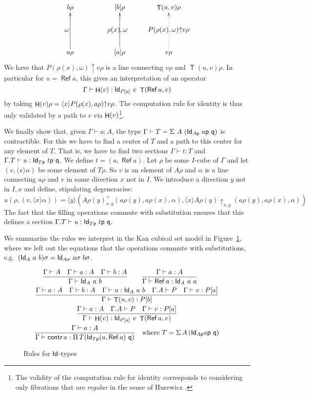 \documentclass[10pt,a4paper]{article}
\DeclareMathOperator{\Ref}{\mathsf{Ref}}
\DeclareMathOperator{\Transp}{\mathsf{T}}
\DeclareMathOperator{\HH}{{\sf H}}
\newcommand{\Id}{{\sf Id}}
\newcommand{\pp}{{\sf p}}
\newcommand{\qq}{{\sf q}}
\newcommand{\rup}[1]{#1{\uparrow}}
\newcommand{\rupxy}[1]{#1{\uparrow_{x,y}}}
\newcommand{\bind}[2]{{\langle}#1{\rangle}#2}
\begin{document}
\[
\xymatrix@R=.6cm@C=.6cm{
b\rho                 &&[b]\rho                    &   \Transp(u,v)\rho                                 \\
\omega ~~~     &&\rho(x),\omega~~  &\rup{P(\rho(x),\omega)} v\rho \\
a\rho\ar[uu]      &&[a]\rho\ar[uu]       &   v\rho\ar@{.>}[uu]                        \\
}
\]
We have that $\rup{P(\rho(x),\omega)} v\rho$ is a line connecting
$v\rho$ and $\Transp(u,v)\rho$.  In particular for $u=\Ref a$, this gives
an interpretation of an operator
$$
\Gamma\vdash \HH(v):\Id_{P[a]}~v~\Transp(\Ref a,v)
$$
by taking $\HH(v)\rho = \bind{x}{\rup{P(\rho (x),a\rho)} v\rho}$.  The
computation rule for identity is thus only validated by a path to $v$
via $\HH(v)$\footnote{The validity of the computation rule for
  identity corresponds to considering only fibrations that are {\em
    regular} in the sense of Hurewicz \cite{hurewicz}.}.


We finally show that, given $\Gamma\vdash a:A$, the type $\Gamma
\vdash T = \Sigma~A~(\Id_{A\pp}~a\pp~\qq)$ is contractible. For this
we have to find a center of $T$ and a path to this center for any
element of $T$.  That is, we have to find two sections $\Gamma\vdash
t:T$ and $\Gamma.T\vdash u:\Id_{T\pp}~t\pp~\qq$.  We define $t =
(a,\Ref a)$. Let $\rho$ be some $I$-cube of $\Gamma$ and let
$(v,\bind{x}{\alpha})$ be some element of $T\rho$. So $v$ is an
element of $A\rho$ and $\alpha$ is a line connecting $a\rho$ and $v$
in some direction $x$ not in $I$. We introduce a direction $y$ not in
$I,x$ and define, stipulating degeneracies:
$$
u(\rho,(v,\bind{x}{\alpha})) = \bind{y}{(A\rho(y)^+ _{x,y}
  (a\rho(y),a\rho(x),\alpha),\bind{x}{\rupxy{A\rho(y)}
    (a\rho(y),a\rho(x),\alpha)})}
$$
The fact that the filling operations commute with substitution ensures
that this defines a section $\Gamma.T\vdash u:\Id_{T\pp}~t\pp~\qq$.

We summarize the rules we interpret in the Kan cubical set model in
Figure~\ref{fig:idtype}, where we left out the equations that the
operations commute with substitutions, e.g.\ $(\Id_A~a~b) \sigma =
\Id_{A \sigma}~a\sigma~ b\sigma$.
\begin{figure}[t]
  \label{fig:idtype}
  \caption{Rules for $\Id$-types}
  \begin{gather*}
    \frac {\Gamma \vdash A \quad \Gamma \vdash a : A \quad \Gamma \vdash
      b : A} {\Gamma \vdash \Id_A~a~b} \qquad
    \frac {\Gamma \vdash a : A} {\Gamma\vdash \Ref a:\Id_A~a~a} \qquad
    \\
    \frac {\Gamma\vdash a:A \quad \Gamma\vdash b:A \quad \Gamma\vdash
      u:\Id_A~a~b \quad \Gamma.A \vdash P \quad \Gamma\vdash v:P[a]}
    {\Gamma\vdash \Transp(u,v):P[b]}
    \\
    \frac {\Gamma \vdash a : A \quad \Gamma.A \vdash P \quad \Gamma
      \vdash v : P [a]} {\Gamma \vdash \HH (v):\Id_{P[a]}~v~\Transp(\Ref
      a,v)}
    \\
    \frac {\Gamma \vdash a : A} {\Gamma \vdash \mathsf{contr}\, a :
      \Pi\, T (\Id_{T \pp} (a, \Ref a)~\qq) } \quad \text {where } T =
    \Sigma\,A\,(\Id_{A \pp} a \pp~ \qq)
  \end{gather*}
\end{figure}
\end{document}
